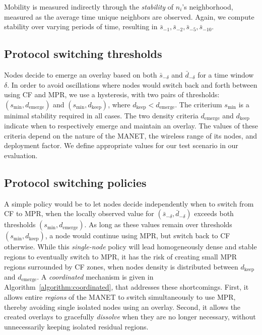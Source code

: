Mobility is measured indirectly through the \emph{stability} of $n_i$'s neighborhood, measured as the average time unique neighbors are observed.
Again, we compute stability over varying periods of time, resulting in $\bar{s}_{-1},\bar{s}_{-2},\bar{s}_{-5},\bar{s}_{-10}$.

\subsection{Protocol switching thresholds}

Nodes decide to emerge an overlay based on both $\bar{s}_{-\delta}$ and $\bar{d}_{-\delta}$ for a time window $\delta$.
In order to avoid oscillations where nodes would switch back and forth between using CF and MPR, we use a hysteresis, with two pairs of thresholds: 
	$({s}_{\text{min}},{d}_{\text{emerge}})$ 
and $({s}_{\text{min}},{d}_{\text{keep}})$, where
	${d}_{\text{keep}} < {d}_{\text{emerge}}$.
The criterium ${s}_{\text{min}}$ is a minimal stability required in all cases.
The two density criteria ${d}_{\text{emerge}}$ and ${d}_{\text{keep}}$ indicate when to respectively emerge and maintain an overlay.
The values of these criteria depend on the nature of the MANET, the wireless range of its nodes, and deployment factor.
We define appropriate values for our test scenario in our evaluation.

\subsection{Protocol switching policies}

A simple policy would be to let nodes decide independently when to switch from CF to MPR, when the locally observed value for $(\bar{s}_{-\delta},\bar{d}_{-\delta})$ exceeds both thresholds $({s}_{\text{min}},{d}_{\text{emerge}})$.
As long as these values remain over thresholds $({s}_{\text{min}},{d}_{\text{keep}})$, a node would continue using MPR, but switch back to CF otherwise.
While this \emph{single-node} policy will lead homogeneously dense and stable regions to eventually switch to MPR, it has the risk of creating small MPR regions surrounded by CF zones, when nodes density is distributed between ${d}_{\text{keep}}$ and ${d}_{\text{emerge}}$.
A \emph{coordinated} mechanism is given in Algorithm~\ref{algorithm:coordinated}, that addresses these shortcomings.
First, it allows entire \emph{regions} of the MANET to switch simultaneously to use MPR, thereby avoiding single isolated nodes using an overlay.
Second, it allows the created overlays to gracefully \emph{dissolve} when they are no longer necessary, without unnecessarily keeping isolated residual regions.

